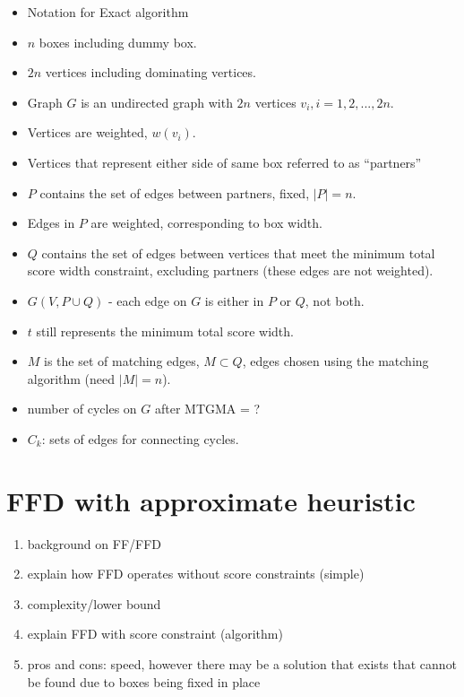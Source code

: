 \documentclass{llncs}
\begin{document}
\begin{itemize}
	\item Notation for Exact algorithm
	\item $n$ boxes including dummy box.
	\item $2n$ vertices including dominating vertices.
	\item Graph $G$ is an undirected graph with $2n$ vertices $v_i, i = 1, 2, ...,2n$.
	\item Vertices are weighted, $w(v_i)$.
	\item Vertices that represent either side of same box referred to as ``partners''
	\item $P$ contains the set of edges between partners, fixed, $|P| = n$.
	\item Edges in $P$ are weighted, corresponding to box width.
	\item $Q$ contains the set of edges between vertices that meet the minimum total score width constraint, excluding partners (these edges are not weighted).
	\item $G(V, P \cup Q)$ - each edge on $G$ is either in $P$ or $Q$, not both.
	\item $t$ still represents the minimum total score width.
	\item $M$ is the set of matching edges, $M \subset Q$, edges chosen using the matching algorithm (need $|M| = n$).
	\item number of cycles on $G$ after MTGMA =  ?
	\item $C_k$: sets of edges for connecting cycles.
	
\end{itemize}


\section{FFD with approximate heuristic}
\begin{enumerate}
	\item background on FF/FFD
	\item explain how FFD operates without score constraints (simple)
	\item complexity/lower bound
	\item explain FFD with score constraint (algorithm)
	\item pros and cons: speed, however there may be a solution that exists that cannot be found due to boxes being fixed in place
\end{enumerate}
\end{document}
